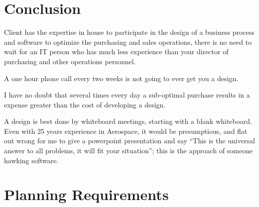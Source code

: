 \documentclass[letterpaper,10pt,english]{sphinxmanual}
\begin{document}
\chapter{Conclusion}
\label{BusinessProcessReengineering:conclusion}
Client has the expertise in house to participate in the design of a
business process and software to optimize the purchasing and sales
operations, there is no need to wait for an IT person who has much less
experience than your director of purchasing and other operations
personnel.

A one hour phone call every two weeks is not going to ever get you a
design.

I have no doubt that several times every day a sub-optimal purchase
results in a expense greater than the cost of developing a design.

A design is best done by whiteboard meetings, starting with a blank
whiteboard. Even with 25 years experience in Aerospace, it would be
presumptious, and flat out wrong for me to give a powerpoint
presentation and say ``This is the universal answer to all problems, it
will fit your situation''; this is the approach of someone hawking
software.


\chapter{Planning Requirements}
\label{BusinessProcessReengineering:planning-requirements}
\end{document}
